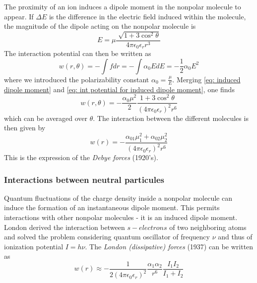 \documentclass[../phys-f308.tex]{subfiles}
\begin{document}
    The proximity of an ion induces a dipole moment in the nonpolar molecule to appear. If $\Delta E$ is the difference in the electric field induced within the molecule, the magnitude of the dipole acting on the nonpolar molecule is
    \begin{equation}
        E = \mu\frac{\sqrt[]{1+3\cos^2\theta}}{4\pi\epsilon_0\epsilon_r r^3}\label{eq: induced dipole moment}
    \end{equation}
    The interaction potential can then be written as
    \begin{equation}
        w(r,\theta) = -\int fdr = -\int \alpha_0 EdE = -\frac{1}{2}\alpha_0E^2\label{eq: int potential for induced dipole moment}
    \end{equation}
    where we introduced the polarizability constant $\alpha_0 = \frac{\mu}{E}$. Merging \eqref{eq: induced dipole moment} and \eqref{eq: int potential for induced dipole moment}, one finds
    \begin{equation}
        w(r,\theta) = -\frac{\alpha_0\mu^2}{2}\frac{1+3\cos^2\theta}{\left(4\pi\epsilon_0\epsilon_r\right)^2 r^6}
    \end{equation}
    which can be averaged over $\theta$. The interaction between the different molecules is then given by
    \begin{equation}
        w(r) = -\frac{\alpha_{01}\mu_1^2+\alpha_{02}\mu_2^2}{\left(4\pi\epsilon_0\epsilon_r\right)^2r^6}\label{eq: Debye forces}
    \end{equation}
    This is the expression of the \emph{Debye forces} (1920's).

    \subsubsection{Interactions between neutral particules}

    \color{purple}Quantum\color{black}  fluctuations of the charge density inside a nonpolar molecule can induce the formation of an instantaneous dipole moment. This permits interactions with other nonpolar molecules - it is an induced dipole moment. London derived the interaction between $s-electrons$ of two neighboring atoms and solved the problem considering quantum oscillator of frequency $\nu$ and thus of ionization potential $I = h\nu$. The \emph{London (dissipative) forces} (1937) can be written as
    \begin{equation}
        w(r) \approx -\frac{1}{2\left(4\pi\epsilon_0\epsilon_r\right)^2}\frac{\alpha_1\alpha_2}{r^6}\frac{I_1I_2}{I_1+I_2}\label{eq: London (dissipative) forces}
    \end{equation}
\end{document}
